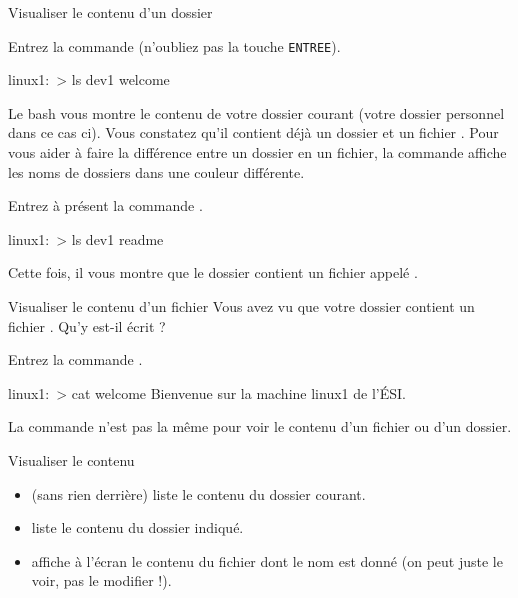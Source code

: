 \documentclass[a4paper,11pt]{style-esi/td}
\begin{document}
		\begin{Experience}{Visualiser le contenu d'un dossier}
			\vspace{-1em}
			\begin{steps}
			\item 
				Entrez la commande  (n'oubliez pas la touche \verb|ENTREE|).				
				\begin{Console}
					linux1:~> ls
					dev1 welcome
				\end{Console}				
				Le bash vous montre le contenu de votre dossier courant
				(votre dossier personnel dans ce cas ci).
				Vous constatez qu'il contient déjà un dossier 
				et un fichier .
				Pour vous aider à faire la différence
				entre un dossier en un fichier, 
				la commande 
				affiche les noms de dossiers dans une couleur différente.
			\item 
				Entrez à présent la commande .
				\begin{Console}
					linux1:~> ls dev1
					readme
				\end{Console}				
				Cette fois, il vous montre que le dossier  contient
				un fichier appelé .
			\end{steps}			
		\end{Experience}

\newpage

		\begin{Experience}{Visualiser le contenu d'un fichier}
			Vous avez vu que votre dossier contient un fichier \samp{welcome}.
			Qu'y est-il écrit ?
			\begin{steps}
			\item 
				Entrez la commande \kbd{cat welcome}.
				\begin{Console}
					linux1:~> cat welcome
					Bienvenue sur la machine linux1 de l'ÉSI.
				\end{Console}
				La commande n'est pas la même pour voir le contenu d'un fichier
				ou d'un dossier.
			\end{steps}			
		\end{Experience}

		\bigskip
		\begin{theorie}{Visualiser le contenu}
			\begin{itemize}
			\item {}
				(sans rien derrière) liste le contenu du dossier courant.
			\item {}
				liste le contenu du dossier indiqué.
			\item {}
				affiche à l'écran le contenu du fichier dont le nom est donné 
				(on peut juste le voir, pas le modifier !).
			\end{itemize}
		\end{theorie}
	
\end{document}

